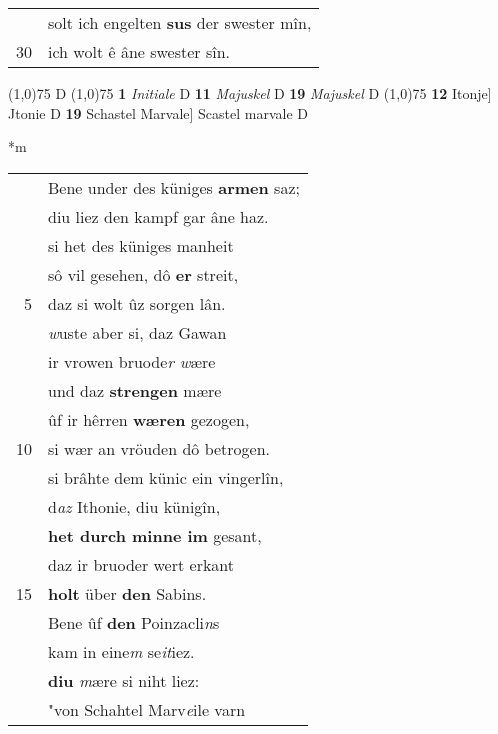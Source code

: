 \documentclass[8pt,a4paper,notitlepage]{article}
\begin{document}
\begin{table}[ht]
\begin{minipage}[t]{0.5\linewidth}
\begin{tabular}{rl}
 & solt ich engelten \textbf{sus} der swester mîn,\\ 
30 & ich wolt ê âne swester sîn.\\ 
\end{tabular}
\scriptsize
\line(1,0){75} \newline
D \newline
\line(1,0){75} \newline
\textbf{1} \textit{Initiale} D  \textbf{11} \textit{Majuskel} D  \textbf{19} \textit{Majuskel} D  \newline
\line(1,0){75} \newline
\textbf{12} Itonje] Jtonie D \textbf{19} Schastel Marvale] Scastel marvale D \newline
\end{minipage}
\hspace{0.5cm}
\begin{minipage}[t]{0.5\linewidth}
\small
\begin{center}*m
\end{center}
\begin{tabular}{rl}
 & Bene under des küniges \textbf{armen} saz;\\ 
 & diu liez den kampf gar âne haz.\\ 
 & si het des küniges manheit\\ 
 & sô vil gesehen, dô \textbf{er} streit,\\ 
5 & daz si  wolt ûz sorgen lân.\\ 
 & \textit{w}uste aber si, daz Gawan\\ 
 & ir vrowen bruode\textit{r w}ære\\ 
 & und daz  \textbf{strengen} mære\\ 
 & ûf ir hêrren \textbf{wæren} gezogen,\\ 
10 & si wær an vröuden dô betrogen.\\ 
 & si brâhte dem künic ein vingerlîn,\\ 
 & d\textit{az} Ithonie, diu künigîn,\\ 
 & \textbf{het durch minne im} gesant,\\ 
 & daz ir bruoder wert erkant\\ 
15 & \textbf{holt} über \textbf{den} Sabins.\\ 
 & Bene ûf \textbf{den} Poinzacli\textit{n}s\\ 
 & kam in eine\textit{m} se\textit{it}iez.\\ 
 & \textbf{diu} \textit{m}ære si niht liez:\\ 
 & "von Schahtel Marv\textit{e}ile varn\\ 

\end{tabular}
\end{minipage}
\end{table}
\end{document}
